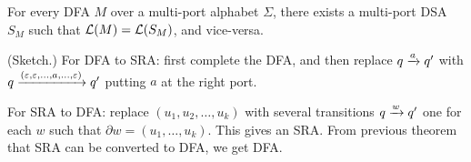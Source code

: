 \begin{theorem}
 For every DFA $M$ over a multi-port alphabet $\Sigma$, there exists
 a multi-port DSA $S_M$ such that $\mathcal{L}(M) = \mathcal{L}(S_M)$, and
 vice-versa.
\end{theorem}
\begin{IEEEproof} (Sketch.) For DFA to SRA: first complete the DFA, and
 then replace $q \xrightarrow{a} q'$ with
 $q \xrightarrow{(\varepsilon, \varepsilon, \dots, a, \dots, \varepsilon)} q'$ putting $a$ at the right
 port.%

 For SRA to DFA: replace $(u_1, u_2, \dots, u_k)$ with several
 transitions $q \xrightarrow{w} q'$ one for each $w$ such that
 $\partial w = (u_1, \dots, u_k)$. This gives an SRA. From previous
 theorem that SRA can be converted to DFA, we get DFA.%

\end{IEEEproof}%





